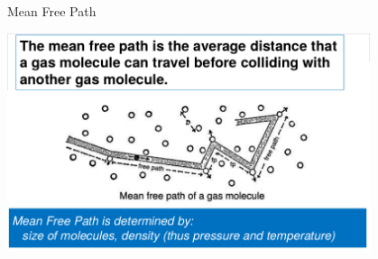 \documentclass[11]{beamer}
\begin{document}
\begin{frame}{Mean Free Path}

       \begin{center}
				\includegraphics[width=0.8\textwidth]{MeanFreePath.png}
		\end{center}   

\end{frame}
\end{document}
